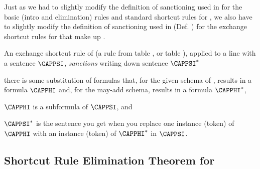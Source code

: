 Just as we had to slightly modify the definition of sanctioning used in \GSD{} for the basic (intro and elimination) rules and standard shortcut rules for \GQD{}, we also have to slightly modify the definition of sanctioning used in \GSDP{} (Def. ) for the exchange shortcut rules for \GQD{} that make up \GQDP{}.
\begin{majorILnc}{}
An exchange shortcut rule  of \GQDP{} (a rule from table , or table ), applied to a line with a \GQL{} sentence $\CAPPSI$, \emph{sanctions} writing down sentence $\CAPPSI^*$ \Iff
\begin{cenumerate}
\item there is some substitution of \GQL{} formulas that, for the given schema of , results in a formula $\CAPPHI$ and, for the may-add schema, results in a formula $\CAPPHI^*$,
\item $\CAPPHI$ is a subformula of $\CAPPSI$, and
\item $\CAPPSI^*$ is the \GSL{} sentence you get when you replace one instance (token) of $\CAPPHI$ with an instance (token) of $\CAPPHI^*$ in $\CAPPSI$. 
\end{cenumerate}
\end{majorILnc}

\subsection{Shortcut Rule Elimination Theorem for \GQD{}}\label{Shortcut Rule Elimination Theorem Section}


